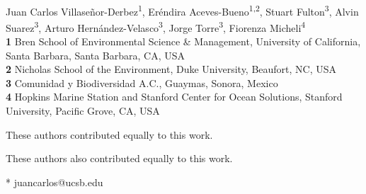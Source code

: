 \documentclass[10pt,letterpaper]{article}
\date{}
\providecommand{\DIFaddbegin}{} %
\providecommand{\DIFaddend}{} %
\providecommand{\DIFdelbegin}{} %
\providecommand{\DIFdelend}{} %
\newcommand{\DIFscaledelfig}{0.5}
\newlength{\DIFdelgraphicswidth} %
\newlength{\DIFdelgraphicsheight} %
\newcommand{\DIFaddincludegraphics}[2][]{{\color{blue}\fbox{\DIFOincludegraphics[#1]{#2}}}} %
\newcommand{\DIFdelincludegraphics}[2][]{%
\sbox{\DIFdelgraphicsbox}{\DIFOincludegraphics[#1]{#2}}%
\settoboxwidth{\DIFdelgraphicswidth}{\DIFdelgraphicsbox} %
\settoboxtotalheight{\DIFdelgraphicsheight}{\DIFdelgraphicsbox} %
\scalebox{\DIFscaledelfig}{%
\parbox[b]{\DIFdelgraphicswidth}{\usebox{\DIFdelgraphicsbox}\\[-\baselineskip] \rule{\DIFdelgraphicswidth}{0em}}\llap{\resizebox{\DIFdelgraphicswidth}{\DIFdelgraphicsheight}{%
\setlength{\unitlength}{\DIFdelgraphicswidth}%
\begin{picture}(1,1)%
\thicklines\linethickness{2pt} %
{\color[rgb]{1,0,0}\put(0,0){\framebox(1,1){}}}%
{\color[rgb]{1,0,0}\put(0,0){\line( 1,1){1}}}%
{\color[rgb]{1,0,0}\put(0,1){\line(1,-1){1}}}%
\end{picture}%
}\hspace*{3pt}}} %
} %
\DeclareRobustCommand{\DIFaddbegin}{\DIFOaddbegin \let\includegraphics\DIFaddincludegraphics} %
\DeclareRobustCommand{\DIFaddend}{\DIFOaddend \let\includegraphics\DIFOincludegraphics} %
\DeclareRobustCommand{\DIFdelbegin}{\DIFOdelbegin \let\includegraphics\DIFdelincludegraphics} %
\DeclareRobustCommand{\DIFdelend}{\DIFOaddend \let\includegraphics\DIFOincludegraphics} %
\begin{document}
\vspace*{0.2in}

\begin{flushleft}
{\Large
\textbf\DIFdelbegin %
\DIFdelend \DIFaddbegin {} \DIFaddend %
}
\newline
\\
Juan Carlos Villaseñor-Derbez\textsuperscript{1\Yinyang*},
Eréndira Aceves-Bueno\textsuperscript{1,2\Yinyang},
Stuart Fulton\textsuperscript{3\ddag},
Alvin Suarez\textsuperscript{3\ddag},
Arturo Hernández-Velasco\textsuperscript{3\ddag},
Jorge Torre\textsuperscript{3\ddag},
Fiorenza Micheli\textsuperscript{4\ddag}
\\
\bigskip
\textbf{1} Bren School of Environmental Science \& Management, University of California, Santa Barbara, Santa Barbara, CA, USA
\\
\textbf{2} Nicholas School of the Environment, Duke University, Beaufort, NC, USA
\\
\textbf{3} Comunidad y Biodiversidad A.C., Guaymas, Sonora, Mexico
\\
\textbf{4} Hopkins Marine Station and Stanford Center for Ocean Solutions, Stanford University, Pacific Grove, CA, USA
\\
\bigskip

% 
%
\Yinyang These authors contributed equally to this work.

\ddag These authors also contributed equally to this work.




* juancarlos@ucsb.edu

\end{flushleft}
\end{document}
